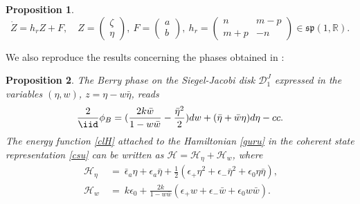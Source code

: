 \documentclass[12pt]{amsart}
\numberwithin{equation}{section}
\newtheorem{Proposition}{Proposition}
\theoremstyle{definition}
\begin{document}
\begin{Proposition}
\begin{equation}
\dot{Z}=h_rZ+F, \quad Z=
\left(\begin{array}{c}\zeta \\ \eta\end{array}\right), ~ F=\left(\begin{array}{c} a \\
    b \end{array}\right),   ~ h_r= 
\left(\begin{array}{cc} n & m-p\\
    m+p  & 
    -n  \end{array}\right) \in {{\mathfrak{{sp}}}}(1,{\ensuremath{\mathbb{R}}}). 
\end{equation}
\end{Proposition}
We also reproduce the results concerning the phases obtained in \cite{FC}:
\begin{Proposition}\label{prFAZ}
The Berry phase on the Siegel-Jacobi disk ${{\mathcal{{D}}}}^J_1$ expressed in
the variables $(\eta,w)$, $z=\eta-w\bar{\eta}$, reads
\begin{equation}\label{FFV}
\frac{2}\iid\phi_B=
(\frac{2k\bar{w}}{1-w\bar{w}}-\frac{\bar{\eta}^2}{2}) dw
+(\bar{\eta} + \bar{w}\eta)d \eta - cc . 
\end{equation}
The energy  function \eqref{clH} attached to the Hamiltonian
\eqref{guru}  in  the
coherent state representation \eqref{csu} can be
written as  ${{\mathcal{{H}}}}=
{{\mathcal{{H}}}}_{\eta}+{{\mathcal{{H}}}}_{w}$, where 
\begin{subequations}\label{realHH}
\begin{align}
~{{\mathcal{{H}}}}_{\eta}  ~ & =  ~  \bar{\epsilon}_a\eta+\epsilon_a\bar{\eta} + 
\frac{1}{2}(\epsilon_+\eta^2+\epsilon_-\bar{\eta}^2+\epsilon_0\eta\bar{\eta}),\label{realHH1} \\
~ {{\mathcal{{H}}}}_{w} ~ & =  ~  k\epsilon_0+ \frac{2k}{1-w\bar{w}}(\epsilon_+w+\epsilon_-\bar{w}+\epsilon_0w\bar{w}). \label{realHH2}
\end{align}
\end{subequations}
\end{Proposition}
\end{document}
